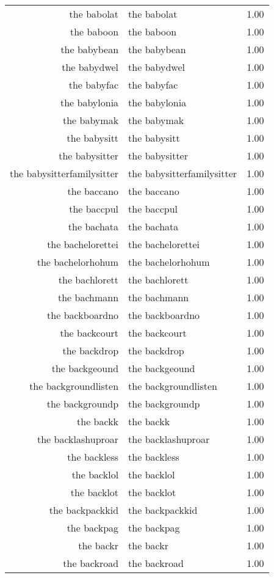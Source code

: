 \begin{table}[ht]
\begin{tabular}{rlr}
  the babolat & the babolat & 1.00 \\ 
  the baboon & the baboon & 1.00 \\ 
  the babybean & the babybean & 1.00 \\ 
  the babydwel & the babydwel & 1.00 \\ 
  the babyfac & the babyfac & 1.00 \\ 
  the babylonia & the babylonia & 1.00 \\ 
  the babymak & the babymak & 1.00 \\ 
  the babysitt & the babysitt & 1.00 \\ 
  the babysitter & the babysitter & 1.00 \\ 
  the babysitterfamilysitter & the babysitterfamilysitter & 1.00 \\ 
  the baccano & the baccano & 1.00 \\ 
  the baccpul & the baccpul & 1.00 \\ 
  the bachata & the bachata & 1.00 \\ 
  the bachelorettei & the bachelorettei & 1.00 \\ 
  the bachelorhohum & the bachelorhohum & 1.00 \\ 
  the bachlorett & the bachlorett & 1.00 \\ 
  the bachmann & the bachmann & 1.00 \\ 
  the backboardno & the backboardno & 1.00 \\ 
  the backcourt & the backcourt & 1.00 \\ 
  the backdrop & the backdrop & 1.00 \\ 
  the backgeound & the backgeound & 1.00 \\ 
  the backgroundlisten & the backgroundlisten & 1.00 \\ 
  the backgroundp & the backgroundp & 1.00 \\ 
  the backk & the backk & 1.00 \\ 
  the backlashuproar & the backlashuproar & 1.00 \\ 
  the backless & the backless & 1.00 \\ 
  the backlol & the backlol & 1.00 \\ 
  the backlot & the backlot & 1.00 \\ 
  the backpackkid & the backpackkid & 1.00 \\ 
  the backpag & the backpag & 1.00 \\ 
  the backr & the backr & 1.00 \\ 
  the backroad & the backroad & 1.00 \\ 

\end{tabular}
\end{table}
